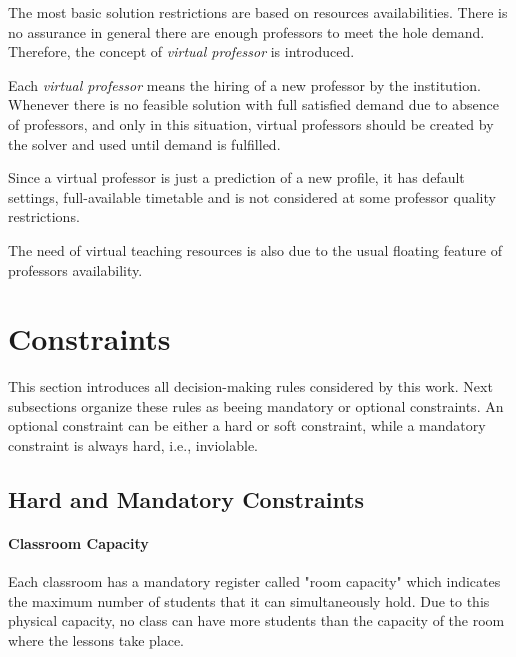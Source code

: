 The most basic solution restrictions are based on resources availabilities. There is no assurance in general there are enough professors to meet the hole demand. Therefore, the concept of \textit{virtual professor} is introduced.

Each \textit{virtual professor} means the hiring of a new professor by the institution. Whenever there is no feasible solution with full satisfied demand due to absence of professors, and only in this situation, virtual professors should be created by the solver and used until demand is fulfilled.

Since a virtual professor is just a prediction of a new profile, it has default settings, full-available timetable and is not considered at some professor quality restrictions.

The need of virtual teaching resources is also due to the usual floating feature of professors availability.



\pagebreak

\section{Constraints}
\label{sec:allconstr}

This section introduces all decision-making rules considered by this work. Next subsections organize these rules as beeing mandatory or optional constraints. An optional constraint can be either a hard or soft constraint, while a mandatory constraint is always hard, i.e., inviolable.


\subsection{Hard and Mandatory Constraints}
\label{sec:mandatory}


\paragraph{Classroom Capacity}
\label{constrroomcap}

Each classroom has a mandatory register called "room capacity" which indicates the maximum number of students that it can simultaneously hold. Due to this physical capacity, no class can have more students than the capacity of the room where the lessons take place.


